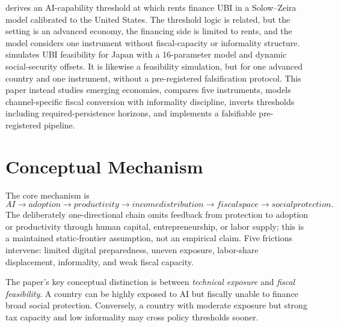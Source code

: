 \documentclass[11pt,a4paper]{article}
\begin{document}
\citet{nayebi2025threshold} derives an AI-capability threshold at which rents finance UBI in a Solow--Zeira model calibrated to the United States. The threshold logic is related, but the setting is an advanced economy, the financing side is limited to rents, and the model considers one instrument without fiscal-capacity or informality structure. \citet{ito2026ubi} simulates UBI feasibility for Japan with a 16-parameter model and dynamic social-security offsets. It is likewise a feasibility simulation, but for one advanced country and one instrument, without a pre-registered falsification protocol. This paper instead studies emerging economies, compares five instruments, models channel-specific fiscal conversion with informality discipline, inverts thresholds including required-persistence horizons, and implements a falsifiable pre-registered pipeline.

\section{Conceptual Mechanism}\label{sec:conceptual}

The core mechanism is
\begin{equation}
AI \rightarrow adoption \rightarrow productivity \rightarrow income distribution \rightarrow fiscal space \rightarrow social protection.
\end{equation}
The deliberately one-directional chain omits feedback from protection to adoption or productivity through human capital, entrepreneurship, or labor supply; this is a maintained static-frontier assumption, not an empirical claim. Five frictions intervene: limited digital preparedness, uneven exposure, labor-share displacement, informality, and weak fiscal capacity.

The paper's key conceptual distinction is between \emph{technical exposure} and \emph{fiscal feasibility}. A country can be highly exposed to AI but fiscally unable to finance broad social protection. Conversely, a country with moderate exposure but strong tax capacity and low informality may cross policy thresholds sooner.
\end{document}
